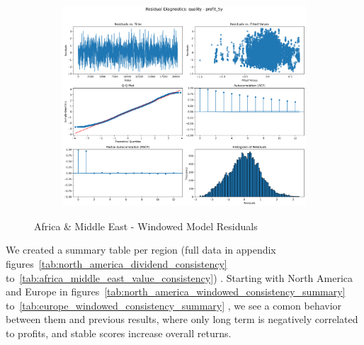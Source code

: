 \documentclass[11pt,english,a4paper,hidelinks]{book}
\begin{document}
\begin{figure}[H]
\begin{subfigure}[b]{0.32\textwidth}
    \end{subfigure}
    \hfill
    \begin{subfigure}[b]{0.32\textwidth}
        \centering
        \includegraphics[width=\textwidth]{images/code/models/linear_regression/first_model/AF/quality_profit_5y_residuals - Gaussian.png}
    \end{subfigure}
    \caption{Africa \& Middle East - Windowed Model Residuals}
    \label{fig:linear_regression_AF_residues_windowed}
\end{figure}

\vspace{0.5cm}
\noindent We created a summary table per region (full data in appendix figures~\ref{tab:north_america_dividend_consistency} to~\ref{tab:africa_middle_east_value_consistency}) . Starting with North America and Europe in figures~\ref{tab:north_america_windowed_consistency_summary} to~\ref{tab:europe_windowed_consistency_summary} , we see a comon behavior between them and previous results, where only long term is negatively correlated to profits, and stable scores increase overall returns.
\end{document}
